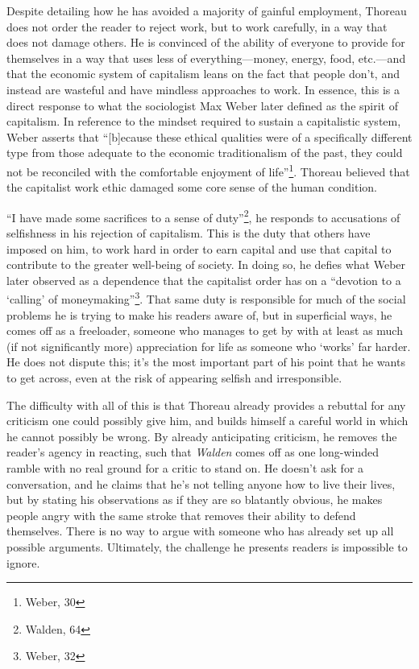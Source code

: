Despite detailing how he has avoided a majority of gainful employment, Thoreau
does not order the reader to reject work, but to work carefully, in a way that
does not damage others. He is convinced of the ability of everyone to provide
for themselves in a way that uses less of everything---money, energy, food,
etc.---and that the economic system of capitalism leans on the fact that
people don't, and instead are wasteful and have mindless approaches to work.
In essence, this is a direct response to what the sociologist Max Weber
later defined as the spirit of capitalism. In reference to the mindset
required to sustain a capitalistic system, Weber asserts that ``[b]ecause
these ethical qualities were of a specifically different type from those
adequate to the economic traditionalism of the past, they could not be
reconciled with the comfortable enjoyment of life''\footnote{Weber, 30}.
Thoreau believed that the capitalist work ethic damaged some core sense of the
human condition.

``I have made some sacrifices to a sense of duty''\footnote{Walden, 64}, he
responds to accusations of selfishness in his rejection of capitalism. This is
the duty that others have imposed on him, to work hard in order to earn capital
and use that capital to contribute to the greater well-being of society. In
doing so, he defies what Weber later observed as a dependence that the
capitalist order has on a ``devotion to a `calling' of
moneymaking''\footnote{Weber, 32}. That same duty is responsible for much of the
social problems he is trying to make his readers aware of, but in superficial
ways, he comes off as a freeloader, someone who manages to get by with at least
as much (if not significantly more) appreciation for life as someone who `works'
far harder. He does not dispute this; it's the most important part of his point
that he wants to get across, even at the risk of appearing selfish and
irresponsible.

The difficulty with all of this is that Thoreau already provides a rebuttal for
any criticism one could possibly give him, and builds himself a careful world in
which he cannot possibly be wrong. By already anticipating criticism, he removes
the reader's agency in reacting, such that \textit{Walden} comes off as one
long-winded ramble with no real ground for a critic to stand on. He doesn't ask
for a conversation, and he claims that he's not telling anyone how to live their
lives, but by stating his observations as if they are so blatantly obvious, he
makes people angry with the same stroke that removes their ability to defend
themselves. There is no way to argue with someone who has already set up all
possible arguments. Ultimately, the challenge he presents readers is
impossible to ignore.

